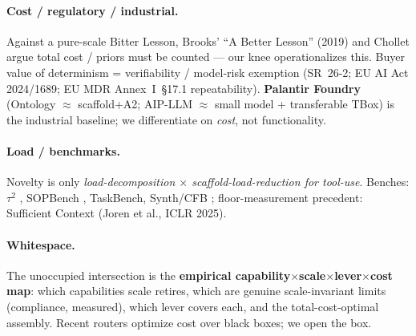 \documentclass[10pt]{article}
\begin{document}
\paragraph{Cost / regulatory / industrial.} Against a pure-scale Bitter Lesson, Brooks' ``A Better Lesson'' (2019) and Chollet \citep{ax1911_01547} argue total cost / priors must be counted --- our knee operationalizes this. Buyer value of determinism = verifiability / model-risk exemption (SR~26-2; EU AI Act 2024/1689; EU MDR Annex~I~\S17.1 repeatability). \textbf{Palantir Foundry} (Ontology $\approx$ scaffold+A2; AIP-LLM $\approx$ small model + transferable TBox) is the industrial baseline; we differentiate on \emph{cost}, not functionality.

\paragraph{Load / benchmarks.} Novelty is only \emph{load-decomposition $\times$ scaffold-load-reduction for tool-use}. Benches: $\tau^2$ \citep{ax2406_12045}, SOPBench \citep{ax2503_08669}, TaskBench, Synth/CFB \citep{ax2501_10132}; floor-measurement precedent: Sufficient Context (Joren et al., ICLR 2025).

\paragraph{Whitespace.} The unoccupied intersection is the \textbf{empirical capability$\times$scale$\times$lever$\times$cost map}: which capabilities scale retires, which are genuine scale-invariant limits (compliance, measured), which lever covers each, and the total-cost-optimal assembly. Recent routers optimize cost over black boxes; we open the box.
\end{document}

